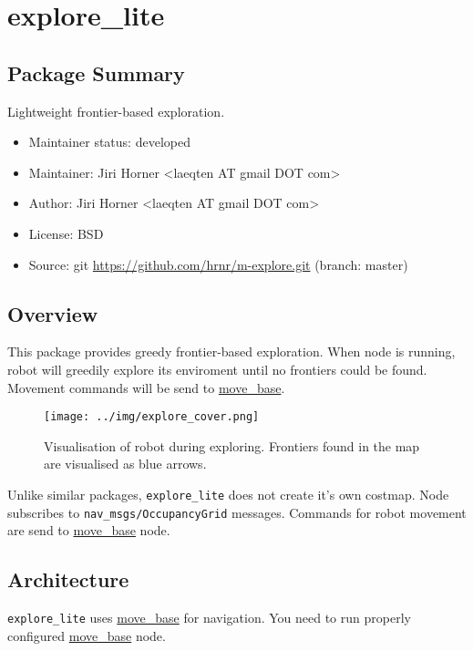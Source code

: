 \chapter{explore\_lite}

\section{Package Summary}

Lightweight frontier-based exploration.

\begin{itemize}
    \item Maintainer status: developed
    \item Maintainer: Jiri Horner \textless laeqten AT gmail DOT com\textgreater
    \item Author: Jiri Horner  \textless laeqten AT gmail DOT com\textgreater
    \item License: BSD
    \item Source: git \url{https://github.com/hrnr/m-explore.git} (branch: master)
\end{itemize}

\section{Overview}

This package provides greedy frontier-based exploration. When node is running, robot will greedily explore its enviroment until no frontiers could be found. Movement commands will be send to \href{http://wiki.ros.org/move_base}{move\_base}.

\begin{figure}
    \centering
    \texttt{[image: ../img/explore\_cover.png]}
    \caption{Visualisation of robot during exploring. Frontiers found in the map are visualised as blue arrows.}
    \label{fig:explorecover}
\end{figure}

Unlike similar packages, \texttt{explore\_lite} does not create it's own costmap. Node subscribes to \texttt{nav\_msgs/OccupancyGrid} messages. Commands for robot movement are send to \href{http://wiki.ros.org/move_base}{move\_base} node.

\section{Architecture}

\texttt{explore\_lite} uses \href{http://wiki.ros.org/move_base}{move\_base} for navigation. You need to run properly configured \href{http://wiki.ros.org/move_base}{move\_base} node.

